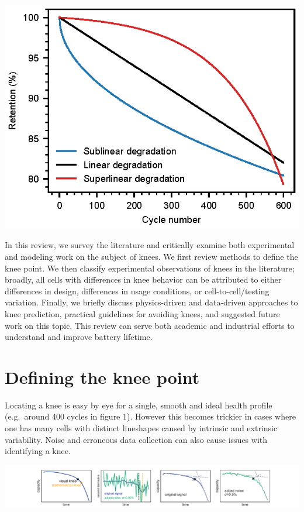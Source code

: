 \documentclass{article}
\begin{document}
{
\centering
\includegraphics[scale=1]{figures/degradation_rates.eps}
}

In this review, we survey the literature and critically examine both experimental and modeling work on the subject of knees. We first review methods to define the knee point. We then classify experimental observations of knees in the literature; broadly, all cells with differences in knee behavior can be attributed to either differences in design, differences in usage conditions, or cell-to-cell/testing variation. Finally, we briefly discuss physics-driven and data-driven approaches to knee prediction, practical guidelines for avoiding knees, and suggested future work on this topic. This review can serve both academic and industrial efforts to understand and improve battery lifetime.

\section{Defining the knee point}

Locating a knee is easy by eye for a single, smooth and ideal health profile (e.g.\ around 400 cycles in figure 1). However this becomes trickier in cases where one has many cells with distinct lineshapes caused by intrinsic and extrinsic variability. Noise and erroneous data collection can also cause issues with identifying a knee.

{
\centering
\includegraphics[width=\textwidth]{images/knee_definition.pdf}
\label{fig:knee_definition}
}
\end{document}
